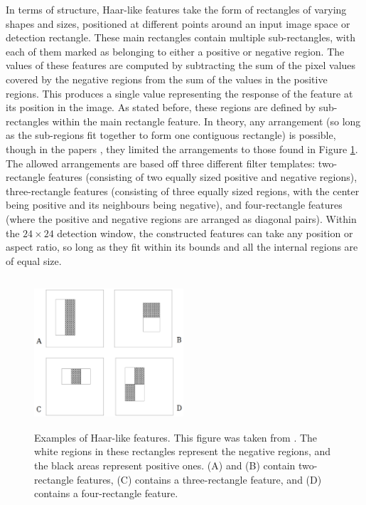\documentclass[11pt,a4paper,oldfontcommands]{memoir}
\begin{document}
In terms of structure, Haar-like features take the form of rectangles of varying shapes and sizes, positioned at different points around an input image space or detection rectangle. These main rectangles contain multiple sub-rectangles, with each of them marked as belonging to either a positive or negative region. The values of these features are computed by subtracting the sum of the pixel values covered by the negative regions from the sum of the values in the positive regions. This produces a single value representing the response of the feature at its position in the image. As stated before, these regions are defined by sub-rectangles within the main rectangle feature. In theory, any arrangement (so long as the sub-regions fit together to form one contiguous rectangle) is possible, though in the papers \cite{viola}\cite{viola_updated}, they limited the arrangements to those found in Figure \ref{fig:haar_features}. The allowed arrangements are based off three different filter templates: two-rectangle features (consisting of two equally sized positive and negative regions), three-rectangle features (consisting of three equally sized regions, with the center being positive and its neighbours being negative), and four-rectangle features (where the positive and negative regions are arranged as diagonal pairs). Within the $24 \times 24$ detection window, the constructed features can take any position or aspect ratio, so long as they fit within its bounds and all the internal regions are of equal size.

\begin{figure}
    \centering
    \includegraphics[width=15em, height=15em]{Images/haar_features.png}
    \caption{Examples of Haar-like features. This figure was taken from \cite{viola_updated}. The white regions in these rectangles represent the negative regions, and the black areas represent positive ones. (A) and (B) contain two-rectangle features, (C) contains a three-rectangle feature, and (D) contains a four-rectangle feature.}
    \label{fig:haar_features}
\end{figure}
\end{document}
